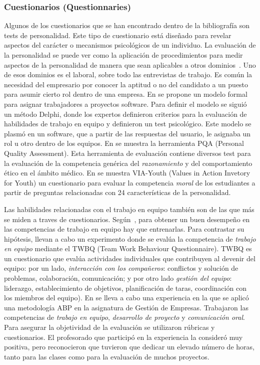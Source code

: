 \subsubsection{Cuestionarios (Questionnaries)}

Algunos de los cuestionarios que se han encontrado dentro de la bibliografía son tests de personalidad. Este tipo de cuestionario está diseñado para revelar aspectos del carácter o mecanismos psicológicos de un individuo. La evaluación de la personalidad se puede ver como la aplicación de procedimientos para medir aspectos de la personalidad de manera que sean aplicables a otros dominios~\cite{wiggins2003paradigms}. Uno de esos dominios es el laboral, sobre todo las entrevistas de trabajo. Es común la necesidad del empresario por conocer la aptitud o no del candidato a un puesto para asumir cierto rol dentro de una empresa. En \cite{andre2011formal} se propone un modelo formal para asignar trabajadores a proyectos software. Para definir el modelo se siguió un método Delphi, donde los expertos definieron criterios para la evaluación de habilidades de trabajo en equipo y definieron un test psicológico. Este modelo se plasmó en un software, que a partir de las respuestas del usuario, le asignaba un rol u otro dentro de los equipos. En \cite{lumsden2005assessment} se muestra la herramienta PQA (Personal Quality Assessment). Esta herramienta de evaluación contiene diversos test para la evaluación de la competencia genérica del \emph{razonamiento} y del {comportamiento ético} en el ámbito médico. En \cite{park2006moral} se muestra VIA-Youth (Values in Action Invetory for Youth) un cuestionario para evaluar la competencia \emph{moral} de los estudiantes a partir de preguntas relacionadas con 24 características de la personalidad. 

Las habilidades relacionadas con el trabajo en equipo también son de las que más se miden a traves de cuestionarios. Según~\cite{martinez2014teamwork}, para obtener un buen desempeño en las competencias de trabajo en equipo hay que entrenarlas. Para contrastar su hipótesis, llevan a cabo un experimento donde se evalúa la competencia de \emph{trabajo en equipo} mediante el TWBQ (Team Work Behaviour Questionnaire). TWBQ es un cuestionario que evalúa actividades individuales que contribuyen al devenir del equipo: por un lado, \emph{interacción con los compañeros}: conflictos y solución de problemas, colaboración, comunicación; y por otro lado \emph{gestión del equipo}: liderazgo, establecimiento de objetivos, planificación de taras, coordinación con los miembros del equipo). En \cite{barbera2011design} se lleva a cabo una experiencia en la que se aplicó una metodología ABP en la asignatura de Gestión de Empresas. Trabajaron las competencias de \emph{trabajo en equipo}, \emph{desarrollo de proyecto} y \emph{comunicación oral}. Para asegurar la objetividad de la evaluación se utilizaron rúbricas y cuestionarios. El profesorado que participó en la experiencia la consideró muy positiva, pero reconocieron que tuvieron que dedicar un elevado número de horas, tanto para las clases como para la evaluación de muchos proyectos.

